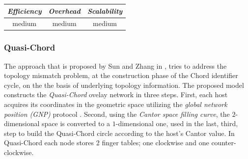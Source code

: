 \begin{center}
\begin{tabular}{ccc}
\emph{Efficiency} & \emph{Overhead} & \emph{Scalability} \\
\hline
%
medium &
%
medium &
%
medium
\end{tabular}
\end{center}

\subsubsection{Quasi-Chord}
The approach that is proposed by Sun and Zhang in \cite{SZ2008}, tries
to address the topology mismatch problem, at the construction phase of the
Chord identifier cycle, on the the basis of underlying topology information.
The proposed model constructs the \emph{Quasi-Chord} ovelay network in three
steps. First, each host acquires its coordinates in the geometric space
utilizing the \emph{global network position (GNP)} protocol \cite{ng_gnp_2001}.
Second, using the \emph{Cantor space filling curve}, the $2$-dimensional space
is converted to a $1$-dimensional one, used in the last, third, step to build
the Quasi-Chord circle according to the host's Cantor value. In Quasi-Chord
each node stores 2 finger tables; one clockwise and one counter-clockwise.

